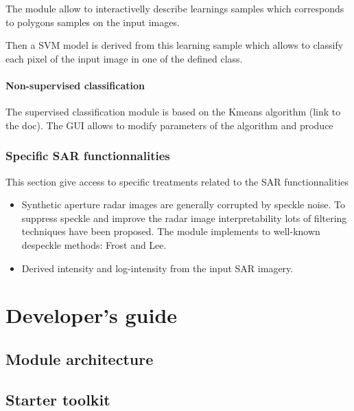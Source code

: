\documentclass{InsightSoftwareGuide}
\begin{document}
The module allow to interactivelly describe learnings samples which corresponds to polygons samples on the input images.

Then a SVM model is derived from this learning sample which allows to classify each pixel of the 
input image in one of the defined class.
 

\subsection{Non-supervised classification}
The supervised classification  module is based on the Kmeans algorithm (link to the doc).
The GUI allows to modify parameters of the algorithm and produce
\section{Specific SAR functionnalities}
This section give access to specific treatments related to the SAR functionnalities

\begin{itemize}
\item Synthetic aperture radar images are generally corrupted by speckle noise. 
To suppress speckle and improve the radar image interpretability lots of filtering techniques have been proposed.
The module implements to well-known despeckle methods: Frost and Lee.
\item Derived intensity and log-intensity from the input SAR imagery.
\end{itemize}

\part{Developer's guide}\label{part:developerguide}
\chapter{Module architecture}
\chapter{Starter toolkit}

% 
% 
\end{document}
